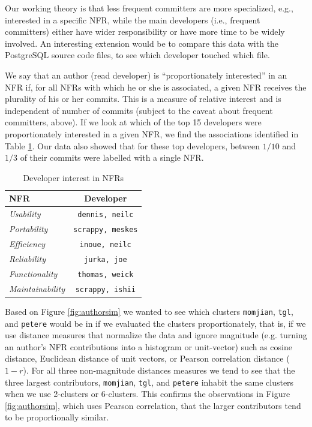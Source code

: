 \documentclass[smallextended]{svjour3}       %
\begin{document}
Our working theory is that less frequent committers are more
specialized, e.g., interested in a specific NFR, while the main developers (i.e., frequent committers) either have wider responsibility or have more
time to be widely involved. An interesting extension would be to compare this data with 
the PostgreSQL source code files, to see which developer touched which file.

We say that an author (read developer) is ``proportionately interested'' in an NFR if, for all NFRs with which he or she is associated, a given NFR receives the plurality of his or her commits. This is a measure of relative interest and is independent of number of commits (subject to the caveat about frequent committers, above).
If we look at which of the top 15 developers were proportionately interested in a given NFR, we find the associations identified in Table \ref{tbl:devinterest}. Our data also showed that for these top developers, between $1/10$ and $1/3$ of their commits were labelled with a single NFR.

\begin{table}
\centering
\begin{tabular}{l|c}
\toprule
\textbf{NFR} & \textbf{Developer} \\
\midrule
\emph{Usability} & \texttt{dennis, neilc} \\
\emph{Portability} & \texttt{scrappy, meskes} \\
\emph{Efficiency} & \texttt{inoue, neilc} \\
\emph{Reliability} & \texttt{jurka, joe} \\
\emph{Functionality} & \texttt{thomas, weick} \\
\emph{Maintainability} & \texttt{scrappy, ishii}\\
\bottomrule
\end{tabular}
	\caption{Developer interest in NFRs}
	\label{tbl:devinterest}
\end{table}

Based on Figure \ref{fig:authorsim} we wanted to see which clusters
\texttt{momjian}, \texttt{tgl}, and \texttt{petere} would be in if we
evaluated the clusters proportionately, that is, if we use distance
measures that normalize the data and ignore magnitude (e.g. turning an
author's NFR contributions into a histogram or unit-vector) such as
cosine distance, Euclidean distance of unit vectors, or Pearson
correlation distance ($1 - r$). 
For all three non-magnitude distances measures we tend to see that
the three largest contributors, \texttt{momjian}, \texttt{tgl}, and
\texttt{petere} inhabit the same clusters when we use 2-clusters or 6-clusters. This confirms the observations in
Figure \ref{fig:authorsim}, which uses Pearson correlation, that the larger contributors tend to be
proportionally similar.
\end{document}
